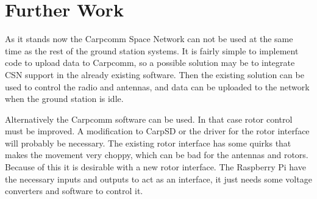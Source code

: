 \section{Further Work}
As it stands now the Carpcomm Space Network can not be used at the same time as the rest of the ground station systems. It is fairly simple to implement code to upload data to Carpcomm, so a possible solution may be to integrate CSN support in the already existing software. Then the existing solution can be used to control the radio and antennas, and data can be uploaded to the network when the ground station is idle.

Alternatively the Carpcomm software can be used. In that case rotor control must be improved. A modification to CarpSD or the driver for the rotor interface will probably be necessary. The existing rotor interface has some quirks that makes the movement very choppy, which can be bad for the antennas and rotors. Because of this it is desirable with a new rotor interface. The Raspberry Pi have the necessary inputs and outputs to act as an interface, it just needs some voltage converters and software to control it.
